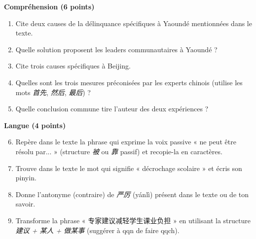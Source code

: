 \documentclass[11pt]{article}
\begin{document}
\begin{exercice}
\begin{textebox}
\end{textebox}
\textbf{Compréhension (6 points)}
\begin{enumerate}
    \item Cite deux causes de la délinquance spécifiques à Yaoundé mentionnées dans le texte.
    \item Quelle solution proposent les leaders communautaires à Yaoundé ?
    \item Cite trois causes spécifiques à Beijing.
    \item Quelles sont les trois mesures préconisées par les experts chinois (utilise les mots \emph{首先}, \emph{然后}, \emph{最后}) ?
    \item Quelle conclusion commune tire l'auteur des deux expériences ?
\end{enumerate}
\textbf{Langue (4 points)}
\begin{enumerate}
    \setcounter{enumi}{5}
    \item Repère dans le texte la phrase qui exprime la voix passive « ne peut être résolu par... » (structure \emph{被} ou \emph{靠} passif) et recopie-la en caractères.
    \item Trouve dans le texte le mot qui signifie « décrochage scolaire » et écris son pinyin.
    \item Donne l'antonyme (contraire) de \emph{严厉} (yánlì) présent dans le texte ou de ton savoir.
    \item Transforme la phrase « 专家建议减轻学生课业负担 » en utilisant la structure \emph{建议 + 某人 + 做某事} (suggérer à qqn de faire qqch).
\end{enumerate}
\end{exercice}
\end{document}
